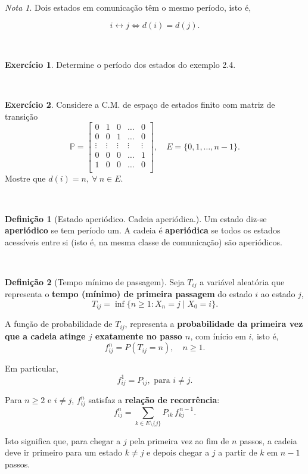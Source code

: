 \documentclass[
  11pt,
  a4paper,
]{book}
\theoremstyle{definition}
\newtheorem{definition}{Definição}[chapter]
\theoremstyle{definition}
\theoremstyle{definition}
\newtheorem{exercise}{Exercício}[chapter]
\theoremstyle{definition}
\theoremstyle{remark}
\newtheorem*{remark}{Nota }
\begin{document}
\(\,\)

\begin{remark}
Dois estados em comunicação têm o mesmo período, isto é,

\[i \longleftrightarrow j \iff d(i)=d(j).\]
\end{remark}

\(\,\)

\begin{exercise}
Determine o período dos estados do exemplo 2.4.
\end{exercise}

\(\,\)

\begin{exercise}
Considere a C.M. de espaço de estados finito com matriz de transição
\[
\mathbb{P} =
\begin{bmatrix}
0 & 1 & 0 & \dots & 0 \\
0 & 0 & 1 & \dots & 0 \\
\vdots & \vdots & \vdots & \vdots & \vdots \\
0 & 0 & 0 & \dots & 1 \\
1 & 0 & 0 & \dots & 0  \\
\end{bmatrix}, \quad E=\{0,1,\dots,n-1\}.
\]
Mostre que \(d(i)=n, ~\forall ~n \in E.\)
\end{exercise}

\(\,\)

\begin{definition}[Estado aperiódico. Cadeia aperiódica.]
Um estado diz-se \textbf{aperiódico} se tem período um. A cadeia é \textbf{aperiódica} se todos os estados acessíveis entre si (isto é, na mesma classe de comunicação) são aperiódicos.
\end{definition}

\(\,\)

\begin{definition}[Tempo mínimo de passagem]
Seja \(T_{ij}\) a variável aleatória que representa o \textbf{tempo (mínimo) de primeira passagem} do estado \(i\) ao estado \(j\),
\[
T_{ij} = \inf \{ n \ge 1 : X_n = j \mid X_0 = i \}.
\]

A função de probabilidade de \(T_{ij}\), representa a \textbf{probabilidade da primeira vez que a cadeia atinge \(j\) exatamente no passo \(n\)}, com ínício em \(i\), isto é,
\[
f_{ij}^n = P(T_{ij} = n), \quad n \ge 1.
\]

Em particular,
\[
f_{ij}^1 = P_{ij}, \text{ para } i \neq j.
\]

Para \(n \ge 2\) e \(i \neq j\), \(f_{ij}^n\) satisfaz a \textbf{relação de recorrência}:
\[
f_{ij}^n = \sum_{k \in E \setminus \{j\}} P_{ik} \, f_{kj}^{\,n-1}.
\]

Isto significa que, para chegar a \(j\) pela primeira vez ao fim de \(n\) passos, a cadeia deve ir primeiro para um estado \(k \neq j\) e depois chegar a \(j\) a partir de \(k\) em \(n-1\) passos.
\end{definition}
\end{document}
